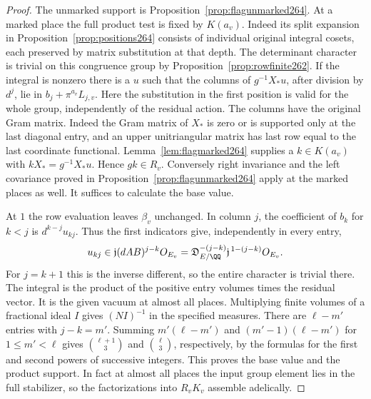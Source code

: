 \documentclass[a4paper,11pt]{article}
\theoremstyle{definition}
\theoremstyle{remark}
\numberwithin{equation}{section}
\begin{document}
\begin{proof}
The unmarked support is Proposition~\ref{prop:flagunmarked264}.
At a marked place the full product test is fixed by \(K(a_v)\).
Indeed its split expansion in Proposition~\ref{prop:positions264}
consists of individual original integral cosets, each preserved
by matrix substitution at that depth. The determinant character
is trivial on this congruence group by
Proposition~\ref{prop:rowfinite262}. If the integral is nonzero
there is a \(u\) such that the columns of \(g^{-1}X_*u\), after
division by \(d^j\), lie in \(b_j+\pi^{a_v}L_{j,v}\).
Here the substitution in the first position is valid for the
whole group, independently of the residual action. The columns
have the original Gram matrix. Indeed the Gram matrix of \(X_*\)
is zero or is supported only at the last diagonal entry, and an
upper unitriangular matrix has last row equal to the last
coordinate functional. Lemma~\ref{lem:flagmarked264} supplies
a \(k\in K(a_v)\) with \(kX_*=g^{-1}X_*u\).
Hence \(gk\in R_v\). Conversely right invariance and the
left covariance proved in Proposition~\ref{prop:flagunmarked264}
apply at the marked places as well. It suffices to calculate
the base value.

At \(1\) the row evaluation leaves \(\beta_v\) unchanged.
In column \(j\), the coefficient of \(b_k\) for \(k<j\) is
\(d^{k-j}u_{kj}\). Thus the first indicators give, independently
in every entry,
\[
   u_{kj}\in\mathfrak j(dAB)^{j-k}O_{E_v}
      =\mathfrak D_{E/\QQ}^{-(j-k)}
         \mathfrak j^{\,1-(j-k)} O_{E_v}.
\]
For \(j=k+1\) this is the inverse different, so the entire
character is trivial there. The integral is the product of
the positive entry volumes times the residual vector. It is
the given vacuum at almost all places. Multiplying finite
volumes of a fractional ideal \(I\) gives \((NI)^{-1}\) in the
specified measures. There are \(\ell-m'\) entries with
\(j-k=m'\). Summing \(m'(\ell-m')\) and
\((m'-1)(\ell-m')\) for \(1\le m'<\ell\) gives
\(\binom{\ell+1}{3}\) and \(\binom{\ell}{3}\), respectively,
by the formulas for the first and second powers of successive
integers. This proves the base value and the product support.
In fact at almost all places the input group element lies in
the full stabilizer, so the factorizations into \(R_vK_v\)
assemble adelically.


\end{proof}
\end{document}
